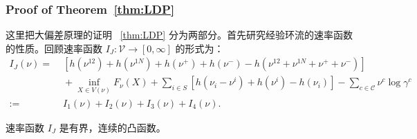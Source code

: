 \subsubsection{Proof of Theorem~\ref{thm:LDP}}\label{appendix:LDP}
这里把大偏差原理的证明 ~\ref{thm:LDP} 分为两部分。首先研究经验环流的速率函数的性质。回顾速率函数 $I_J:\mathcal{V}\to[0,\infty]$ 的形式为：
\begin{equation*}\label{ratefunction1}
	\begin{split}
		I_J(\nu) =&\; \left[h\left(\nu^{12}\right)+h\left(\nu^{1N}\right)
		+h\left(\nu^+\right)+h\left(\nu^-\right)-h\left(\nu^{12}+\nu^{1N}+\nu^++\nu^-\right)\right] \\
		&\;+\inf_{X\in V(\nu)}F_{\nu}(X)+\sum_{i\in S}\left[ h\left(\nu_i-\nu^i\right)+h\left(\nu^i\right)
		-h\left(\nu_i\right)\right]-\sum_{c\in\mathcal{C}}\nu^c\log\gamma^c\\
		:=&\;I_1(\nu)+I_2(\nu)+I_3(\nu)+I_4(\nu).
	\end{split}
\end{equation*}
\begin{proposition}\label{proposition:I}
	速率函数 $I_J$ 是有界，连续的凸函数。
\end{proposition}
